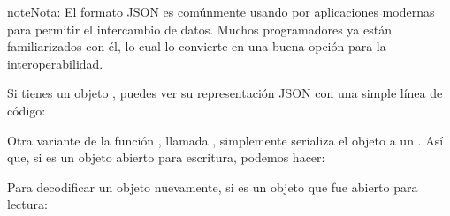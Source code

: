 \documentclass[a5paper,10pt,spanish]{sphinxmanual}
\begin{document}
\begin{sphinxadmonition}{note}{Nota:}
\sphinxAtStartPar
El formato JSON es comúnmente usando por aplicaciones modernas para permitir el intercambio de datos. Muchos programadores ya están familiarizados con él, lo cual lo convierte en una buena opción para la interoperabilidad.
\end{sphinxadmonition}

\sphinxAtStartPar
Si tienes un objeto , puedes ver su representación JSON con una simple línea de código:

\begin{sphinxVerbatim}[commandchars=\\\{\}]
 
  \PYG{p}{[}  \PYG{p}{]}
\end{sphinxVerbatim}

\sphinxAtStartPar
Otra variante de la función , llamada , simplemente serializa el objeto a un {\hyperref[\detokenize{glossary:term-text-file}]{}}. Así que, si  es un objeto {\hyperref[\detokenize{glossary:term-text-file}]{}} abierto para escritura, podemos hacer:

\begin{sphinxVerbatim}[commandchars=\\\{\}]
 
\end{sphinxVerbatim}

\sphinxAtStartPar
Para decodificar un objeto nuevamente, si  es un objeto {\hyperref[\detokenize{glossary:term-text-file}]{}} que fue abierto para lectura:

\begin{sphinxVerbatim}[commandchars=\\\{\}]
  
\end{sphinxVerbatim}
\end{document}
